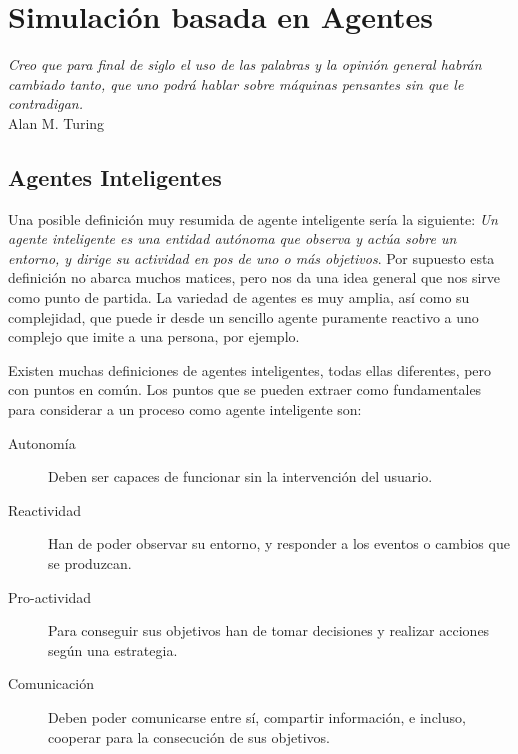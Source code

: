 
\chapter*{Simulación basada en Agentes} \label{cap1}


\begin{flushright}
\begin{minipage}{7.85cm}
    {\em Creo que para final de siglo el uso de las palabras y la opinión
    general habrán cambiado tanto, que uno podrá hablar sobre máquinas pensantes
    sin que le contradigan.} \\ Alan M. Turing
\end{minipage}
\end{flushright}

\vspace*{5mm}

\section*{Agentes Inteligentes}


Una posible definición muy resumida de agente inteligente sería la siguiente:
{\em Un agente inteligente es una entidad autónoma que observa y actúa sobre un
entorno, y dirige su actividad en pos de uno o más objetivos}. Por supuesto
esta definición no abarca muchos matices, pero nos da una idea general que nos
sirve como punto de partida. La variedad de agentes es muy amplia, así como
su complejidad, que puede ir desde un sencillo agente puramente reactivo a uno
complejo que imite a una persona, por ejemplo.

Existen muchas definiciones de agentes inteligentes, todas ellas diferentes,
pero con puntos en común. Los puntos que se pueden extraer como fundamentales
para considerar a un proceso como agente inteligente son:

\begin{description}
 \item[Autonomía]Deben ser capaces de funcionar sin la intervención del usuario.
 \item[Reactividad]Han de poder observar su entorno, y responder a los eventos
 o cambios que se produzcan.
 \item[Pro-actividad]Para conseguir sus objetivos han de tomar decisiones y
 realizar acciones según una estrategia.
 \item[Comunicación]Deben poder comunicarse entre sí, compartir información, e
 incluso, cooperar para la consecución de sus objetivos.
\end{description}

